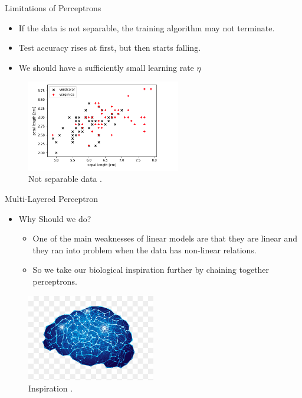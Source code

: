 \begin{frame}{Limitations of Perceptrons}
    \begin{itemize}
        \item If the data is not separable, the training algorithm may not terminate.
        \item Test accuracy rises at first, but then starts falling.
        \item We should have a sufficiently small learning rate $\eta$
    \end{itemize}
	\begin{figure}[H]
		\centering
		\includegraphics[width=0.6\textwidth]{Images/Not_Separable_Data.png}
		\caption{Not separable data \cite{https://vitalflux.com/how-know-data-linear-non-linear/}.}
	\end{figure}
\end{frame}

\begin{frame}{Multi-Layered Perceptron}
    \begin{itemize}
        \item Why Should we do?
        \begin{itemize}
            \item One of the main weaknesses of linear models are that they are linear and they ran into problem when the data has non-linear relations.
            \item So we take our biological inspiration further by chaining together perceptrons.
        \end{itemize}
    \end{itemize}
	\begin{figure}[H]
		\centering
		\includegraphics[width=0.5\textwidth]{Images/Brain.png}
		\caption{Inspiration \cite{https://www.pngwing.com/en/free-png-xzwgm}.}
	\end{figure}
\end{frame}

